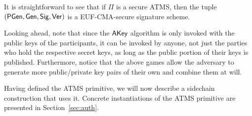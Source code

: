 It is straightforward to see that if
$\Pi$
is a secure ATMS, then
the tuple $( \textsf{PGen}, \mathsf{Gen}, \mathsf{Sig}, \mathsf{Ver} )$ is a \textsf{EUF-CMA}-secure
signature scheme.

Looking ahead, note that since the $\textsf{AKey}$ algorithm is only invoked with
the public keys of the participants, it can be invoked by anyone, not just the
parties who hold the respective secret keys, as long as the public portion of
their keys is published. Furthermore, notice that the above games allow the adversary
to generate more public/private key pairs of their own and combine them at will.

Having defined the ATMS primitive, we will now describe a sidechain
construction that uses it. Concrete instantiations of the ATMS primitive are
presented in Section~\ref{sec:auth}.

